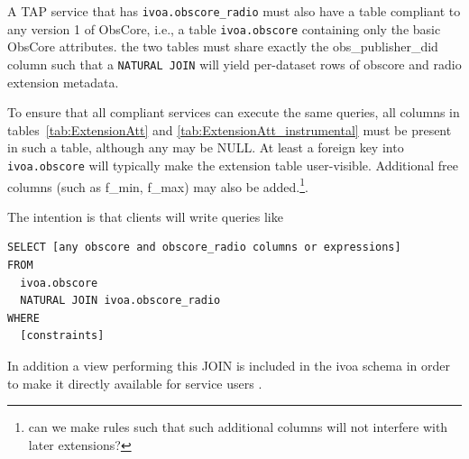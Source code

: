 \documentclass[11pt,a4paper]{ivoa}
\begin{document}
A TAP service that has \verb|ivoa.obscore_radio| must also have a table
compliant to any version 1 of ObsCore, i.e., a table
\verb|ivoa.obscore| containing only the basic ObsCore attributes.
the two tables must share exactly the obs\_publisher\_did 
column such
that a \verb|NATURAL JOIN| will yield per-dataset rows of obscore and
radio extension metadata.  

To ensure that all compliant services can execute the same queries,
all columns in tables~\ref{tab:ExtensionAtt} and \ref{tab:ExtensionAtt_instrumental} must be present in such a
table, although any may be NULL. At least a foreign key into \verb|ivoa.obscore| will typically
make the extension table user-visible. Additional free columns (such as f\_min, f\_max) may also
be added.\footnote{can we make rules such that such additional columns
will not interfere with later extensions?}.

The intention is that clients will write queries like
\begin{lstlisting}
SELECT [any obscore and obscore_radio columns or expressions]
FROM
  ivoa.obscore
  NATURAL JOIN ivoa.obscore_radio
WHERE
  [constraints]
\end{lstlisting}

In addition a view performing this JOIN is included in the ivoa schema in
order to make it directly available for service users . 

%
%
%
%
%
\end{document}
